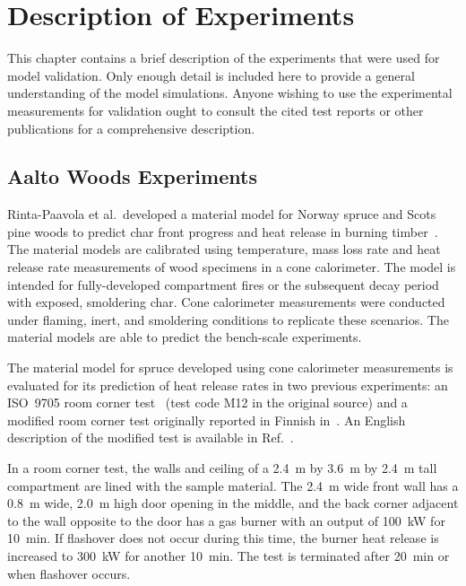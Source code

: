 
\chapter{Description of Experiments}

\label{Experiments_Chapter}

This chapter contains a brief description of the experiments that were used for model validation. Only enough detail is included here to provide a general understanding of the model simulations. Anyone wishing to use the experimental measurements for validation ought to consult the cited test reports or other publications for a comprehensive description.


\section{Aalto Woods Experiments}
\label{Aalto_Woods_Description}

Rinta-Paavola et al.~developed a material model for Norway spruce and Scots pine woods to predict char front progress and heat release in burning timber~\cite{Rinta-Paavola:2023}. The material models are calibrated using temperature, mass loss rate and heat release rate measurements of wood specimens in a cone calorimeter. The model is intended for fully-developed compartment fires or the subsequent decay period with exposed, smoldering char. Cone calorimeter measurements were conducted under flaming, inert, and smoldering conditions to replicate these scenarios. The material models are able to predict the bench-scale experiments.

The material model for spruce developed using cone calorimeter measurements is evaluated for its prediction of heat release rates in two previous experiments: an ISO~9705 room corner test~\cite{Sundstrom:1998} (test code M12 in the original source) and a modified room corner test originally reported in Finnish in~\cite{Hietaniemi:2001}. An English description of the modified test is available in Ref.~\cite{Hietaniemi:1}.

In a room corner test, the walls and ceiling of a 2.4~m by 3.6~m by 2.4~m tall compartment are lined with the sample material. The 2.4~m wide front wall has a 0.8~m wide, 2.0~m high door opening in the middle, and the back corner adjacent to the wall opposite to the door has a gas burner with an output of 100~kW for 10~min. If flashover does not occur during this time, the burner heat release is increased to 300~kW for another 10~min. The test is terminated after 20~min or when flashover occurs.

